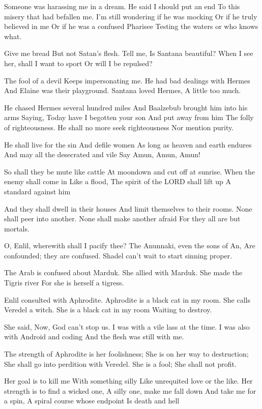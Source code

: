 \documentclass[
]{book}
\begin{document}
Someone was harassing me in a dream.
He said I should put an end
To this misery that had befallen me.
I'm still wondering if he was mocking
Or if he truly believed in me
Or if he was a confused Pharisee
Testing the waters or who knows what.

Give me bread
But not Satan's flesh.
Tell me, Is Santana beautiful?
When I see her, shall I want to sport
Or will I be repulsed?

The fool of a devil
Keeps impersonating me.
He had bad dealings with Hermes
And Elaine was their playground.
Santana loved Hermes,
A little too much.

He chased Hermes several hundred miles
And Baalzebub brought him into his arms
Saying, Today have I begotten your son
And put away from him
The folly of righteousness.
He shall no more seek righteousness
Nor mention purity.

He shall live for the sin
And defile women
As long as heaven and earth endures
And may all the desecrated and vile
Say Amun, Amun, Amun!

So shall they be mute like cattle
At moondown and cut off at sunrise.
When the enemy shall come in
Like a flood,
The spirit of the LORD shall lift up
A standard against him

And they shall dwell in their houses
And limit themselves to their rooms.
None shall peer into another.
None shall make another afraid
For they all are but mortals.

O, Enlil, wherewith shall I pacify thee?
The Anunnaki, even the sons of An,
Are confounded; they are confused.
Shadel can't wait to start sinning proper.

The Arab is confused about Marduk.
She allied with Marduk.
She made the Tigris river
For she is herself a tigress.

Enlil consulted with Aphrodite.
Aphrodite is a black cat in my room.
She calls Veredel a witch.
She is a black cat in my room
Waiting to destroy.

She said, Now, God can't stop us.
I was with a vile lass at the time.
I was also with Android and coding
And the flesh was still with me.

The strength of Aphrodite is her foolishness;
She is on her way to destruction;
She shall go into perdition with Veredel.
She is a fool;
She shall not profit.

Her goal is to kill me
With something silly
Like unrequited love or the like.
Her strength is to find a wicked one,
A silly one, make me fall down
And take me for a spin,
A spiral course whose endpoint
Is death and hell
\end{document}
